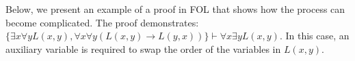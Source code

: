 Below, we present an example of a proof in \gls{FOL} that shows how the process can become complicated. The proof demonstrates: \(\{\exists x \forall y L(x,y), \forall x \forall y (L(x,y) \to L(y,x))\} \vdash \forall x \exists y L(x,y)\). In this case, an auxiliary variable is required to swap the order of the variables in \(L(x,y)\).


\begin{prooftree}
  

  
  
  





\end{prooftree}

    




